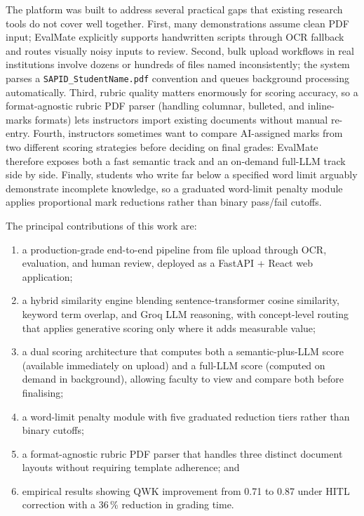 \documentclass[conference]{IEEEtran}
\begin{document}
The platform was built to address several practical gaps that
existing research tools do not cover well together. First, many
demonstrations assume clean PDF input; EvalMate explicitly supports
handwritten scripts through OCR fallback and routes visually noisy
inputs to review. Second, bulk upload workflows in real institutions
involve dozens or hundreds of files named inconsistently; the system
parses a \texttt{SAPID\_StudentName.pdf} convention and queues
background processing automatically. Third, rubric quality matters
enormously for scoring accuracy, so a format-agnostic rubric PDF
parser (handling columnar, bulleted, and inline-marks formats) lets
instructors import existing documents without manual re-entry.
Fourth, instructors sometimes want to compare AI-assigned marks from
two different scoring strategies before deciding on final grades:
EvalMate therefore exposes both a fast semantic track and an
on-demand full-LLM track side by side. Finally, students who write
far below a specified word limit arguably demonstrate incomplete
knowledge, so a graduated word-limit penalty module applies
proportional mark reductions rather than binary pass/fail cutoffs.

The principal contributions of this work are:
\begin{enumerate}
  \item a production-grade end-to-end pipeline from file upload
        through OCR, evaluation, and human review, deployed as a
        FastAPI + React web application;
  \item a hybrid similarity engine blending sentence-transformer
        cosine similarity, keyword term overlap, and Groq
        LLM reasoning, with concept-level routing that applies
        generative scoring only where it adds measurable value;
  \item a dual scoring architecture that computes both a
        semantic-plus-LLM score (available immediately on upload)
        and a full-LLM score (computed on demand in background),
        allowing faculty to view and compare both before finalising;
  \item a word-limit penalty module with five graduated reduction
        tiers rather than binary cutoffs;
  \item a format-agnostic rubric PDF parser that handles three
        distinct document layouts without requiring template
        adherence; and
  \item empirical results showing QWK improvement from 0.71 to 0.87
        under HITL correction with a 36\,\% reduction in grading time.
\end{enumerate}
\end{document}
